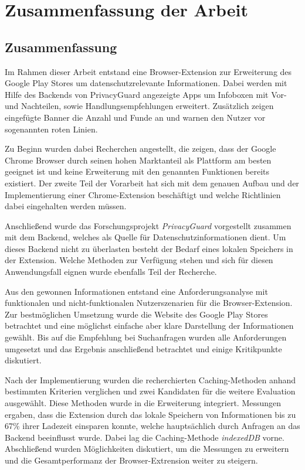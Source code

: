 \chapter{Zusammenfassung der Arbeit}
\label{c:zsm}



\section{Zusammenfassung}
\label{s:zusammenfassung}

Im Rahmen dieser Arbeit entstand eine Browser-Extension zur Erweiterung des Google Play Stores um datenschutzrelevante Informationen. Dabei werden mit Hilfe des Backends von PrivacyGuard angezeigte Apps um Infoboxen mit Vor- und Nachteilen, sowie Handlungsempfehlungen erweitert. Zusätzlich zeigen eingefügte Banner die Anzahl und Funde an und warnen den Nutzer vor sogenannten \glqq roten Linien\grqq{}.

Zu Beginn wurden dabei Recherchen angestellt, die zeigen, dass der Google Chrome Browser durch seinen hohen Marktanteil als Plattform am besten geeignet ist und keine Erweiterung mit den genannten Funktionen bereits existiert. Der zweite Teil der Vorarbeit hat sich mit dem genauen Aufbau und der Implementierung einer Chrome-Extension beschäftigt und welche Richtlinien dabei eingehalten werden müssen.

Anschließend wurde das Forschungsprojekt \textit{PrivacyGuard} vorgestellt zusammen mit dem Backend, welches als Quelle für Datenschutzinformationen dient. Um dieses Backend nicht zu überlasten besteht der Bedarf eines lokalen Speichers in der Extension. Welche Methoden zur Verfügung stehen und sich für diesen Anwendungsfall eignen wurde ebenfalls Teil der Recherche.

Aus den gewonnen Informationen entstand eine Anforderungsanalyse mit funktionalen und nicht-funktionalen Nutzerszenarien für die Browser-Extension. Zur bestmöglichen Umsetzung wurde die Website des Google Play Stores betrachtet und eine möglichst einfache aber klare Darstellung der Informationen gewählt. Bis auf die Empfehlung bei Suchanfragen wurden alle Anforderungen umgesetzt und das Ergebnis anschließend betrachtet und einige Kritikpunkte diskutiert.

Nach der Implementierung wurden die recherchierten Caching-Methoden anhand bestimmten Kriterien verglichen und zwei Kandidaten für die weitere Evaluation ausgewählt. Diese Methoden wurde in die Erweiterung integriert. Messungen ergaben, dass die Extension durch das lokale Speichern von Informationen bis zu 67\% ihrer Ladezeit einsparen konnte, welche hauptsächlich durch Anfragen an das Backend beeinflusst wurde. Dabei lag die Caching-Methode \textit{indexedDB} vorne. Abschließend wurden Möglichkeiten diskutiert, um die Messungen zu erweitern und die Gesamtperformanz der Browser-Extrension weiter zu steigern.

